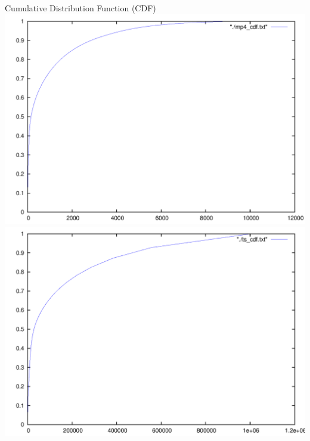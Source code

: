 \documentclass{beamer}
\begin{document}
\begin{frame}{Cumulative Distribution Function (CDF)}
\includegraphics[scale=0.4]{fig/mp4_cdf.png}\hspace*{0.1cm}
\includegraphics[scale=0.4]{fig/ts_cdf.png}
\end{frame}
\end{document}
